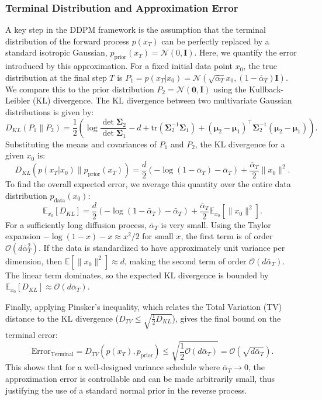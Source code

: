 \documentclass{article}
\begin{document}
\subsubsection{Terminal Distribution and Approximation Error}
A key step in the DDPM framework is the assumption that the terminal distribution of the forward process $p(x_T)$ can be perfectly replaced by a standard isotropic Gaussian, $p_{\text{prior}}(x_T) = \mathcal{N}(0, \mathbf{I})$. Here, we quantify the error introduced by this approximation. For a fixed initial data point $x_0$, the true distribution at the final step $T$ is $P_1 = p(x_T|x_0) = \mathcal{N}(\sqrt{\bar{\alpha}_T}x_0, (1 - \bar{\alpha}_T)\mathbf{I})$. We compare this to the prior distribution $P_2 = \mathcal{N}(\mathbf{0}, \mathbf{I})$ using the Kullback-Leibler (KL) divergence. The KL divergence between two multivariate Gaussian distributions is given by:
\[
D_{KL}(P_1 \| P_2) = \frac{1}{2} \left( \log \frac{\det \boldsymbol{\Sigma}_2}{\det \boldsymbol{\Sigma}_1} - d + \text{tr}(\boldsymbol{\Sigma}_2^{-1}\boldsymbol{\Sigma}_1) + (\boldsymbol{\mu}_2 - \boldsymbol{\mu}_1)^\top \boldsymbol{\Sigma}_2^{-1} (\boldsymbol{\mu}_2 - \boldsymbol{\mu}_1) \right).
\]
Substituting the means and covariances of $P_1$ and $P_2$, the KL divergence for a given $x_0$ is:
\[
D_{KL}(p(x_T|x_0) \| p_{\text{prior}}(x_T)) = \frac{d}{2} \left( -\log(1 - \bar{\alpha}_T) - \bar{\alpha}_T \right) + \frac{\bar{\alpha}_T}{2} \|x_0\|^2.
\]
To find the overall expected error, we average this quantity over the entire data distribution $p_{\text{data}}(x_0)$:
\[
\mathbb{E}_{x_0}[D_{KL}] = \frac{d}{2} \left( -\log(1 - \bar{\alpha}_T) - \bar{\alpha}_T \right) + \frac{\bar{\alpha}_T}{2} \mathbb{E}_{x_0}[\|x_0\|^2].
\]
For a sufficiently long diffusion process, $\bar{\alpha}_T$ is very small. Using the Taylor expansion $-\log(1-x) - x \approx x^2/2$ for small $x$, the first term is of order $\mathcal{O}(d\bar{\alpha}_T^2)$. If the data is standardized to have approximately unit variance per dimension, then $\mathbb{E}[\|x_0\|^2] \approx d$, making the second term of order $\mathcal{O}(d\bar{\alpha}_T)$. The linear term dominates, so the expected KL divergence is bounded by $\mathbb{E}_{x_0}[D_{KL}] \approx \mathcal{O}(d\bar{\alpha}_T)$.

Finally, applying Pinsker's inequality, which relates the Total Variation (TV) distance to the KL divergence ($D_{TV} \le \sqrt{\frac{1}{2} D_{KL}}$), gives the final bound on the terminal error:
\[
\text{Error}_{\text{Terminal}} = D_{TV}(p(x_T), p_{\text{prior}}) \le \sqrt{\frac{1}{2} \mathcal{O}(d\bar{\alpha}_T)} = \mathcal{O}(\sqrt{d\bar{\alpha}_T}).
\]
This shows that for a well-designed variance schedule where $\bar{\alpha}_T \to 0$, the approximation error is controllable and can be made arbitrarily small, thus justifying the use of a standard normal prior in the reverse process.
\end{document}
